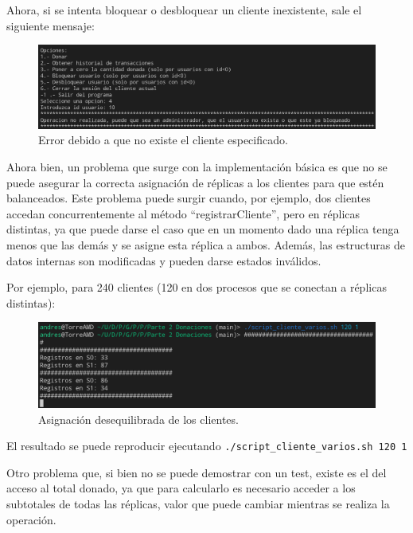 \documentclass{article}
\begin{document}
Ahora, si se intenta bloquear o desbloquear un cliente inexistente, sale el siguiente mensaje:
\begin{figure}[H]
    \centering
    \includegraphics[width=\textwidth]{imagenes/bloqueo/6.png}
    \caption{Error debido a que no existe el cliente especificado.}
\end{figure}


Ahora bien, un problema que surge con la implementación básica es que no se puede asegurar la correcta asignación de réplicas a los clientes para que estén balanceados. Este problema puede surgir cuando, por ejemplo, dos clientes accedan concurrentemente al método ``registrarCliente'', pero en réplicas distintas, ya que puede darse el caso que en un momento dado una réplica tenga menos que las demás y se asigne esta réplica a ambos. Además, las estructuras de datos internas son modificadas y pueden darse estados inválidos.

\bigskip

Por ejemplo, para 240 clientes (120 en dos procesos que se conectan a réplicas distintas):

\begin{figure}[H]
    \centering
    \includegraphics[width=\textwidth]{imagenes/varios/incorrecto.png}
    \caption{Asignación desequilibrada de los clientes.}
\end{figure}

El resultado se puede reproducir ejecutando \verb|./script_cliente_varios.sh 120 1|

\bigskip

Otro problema que, si bien no se puede demostrar con un test, existe es el del acceso al total donado, ya que para calcularlo es necesario acceder a los subtotales de todas las réplicas, valor que puede cambiar mientras se realiza la operación.
\end{document}
